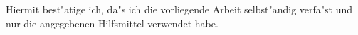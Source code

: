 \clearpage
\pagestyle{empty}

\hbox{}
\vspace{10cm}

Hiermit best"atige ich, da"s ich die vorliegende Arbeit selbst"andig verfa"st und nur die
angegebenen Hilfsmittel verwendet habe.
